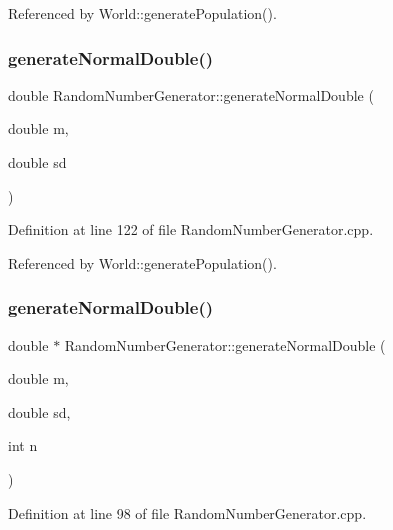 Referenced by World\+::generate\+Population().

\mbox{\label{class_random_number_generator_a9ba1eb0363e94b437c9cf8b157331d1a}} 
\subsubsection{generateNormalDouble()\hspace{0.1cm}{\footnotesize\ttfamily [1/2]}}
{\footnotesize\ttfamily double Random\+Number\+Generator\+::generate\+Normal\+Double (\begin{DoxyParamCaption}\item[{double}]{m,  }\item[{double}]{sd }\end{DoxyParamCaption})}



Definition at line 122 of file Random\+Number\+Generator.\+cpp.



Referenced by World\+::generate\+Population().

\mbox{\label{class_random_number_generator_a77c562dbcc80b5e69941a0a3609af316}} 
\subsubsection{generateNormalDouble()\hspace{0.1cm}{\footnotesize\ttfamily [2/2]}}
{\footnotesize\ttfamily double $\ast$ Random\+Number\+Generator\+::generate\+Normal\+Double (\begin{DoxyParamCaption}\item[{double}]{m,  }\item[{double}]{sd,  }\item[{int}]{n }\end{DoxyParamCaption})}



Definition at line 98 of file Random\+Number\+Generator.\+cpp.

\mbox{\label{class_random_number_generator_ac7870b30aa51e740b06cbead31e7b080}} 
